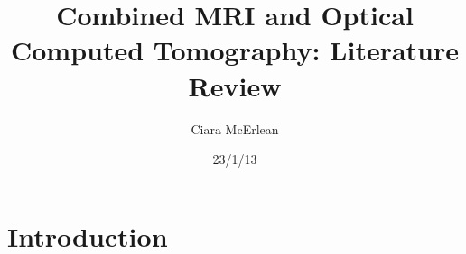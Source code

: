 \documentclass[12pt]{article}
\begin{document}
 
\title{Combined MRI and Optical Computed Tomography: Literature Review} 
\author{Ciara McErlean}
\date{23/1/13} 
\maketitle 

\section{Introduction}
\label{sec:intro}





\end{document}
